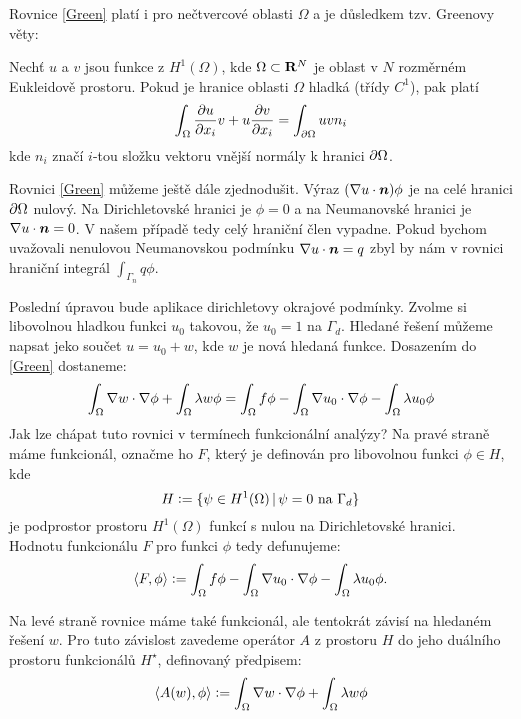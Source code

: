 Rovnice \eqref{Green} platí i pro nečtvercové oblasti $\Omega$ a je důsledkem tzv. Greenovy věty:
\begin{theorem}[Greenova]
   Nechť $u$ a $v$ jsou funkce z $H^1(\Omega)$, kde $\Omega\subset {\rm\bf R}^N$ je oblast v $N$ rozměrném Eukleidově prostoru. 
   Pokud je hranice oblasti $\Omega$ hladká (třídy $C^1$), pak platí
   \[
      \int_\Omega \frac{\partial u}{\partial x_i} v + u \frac{\partial v}{\partial x_i} = \int_{\partial\Omega} uv n_{i}
   \]
   kde $n_{i}$ značí $i$-tou složku vektoru vnější normály k hranici $\partial\Omega$.
\end{theorem}

Rovnici \eqref{Green} můžeme ještě dále zjednodušit. Výraz $(\nabla u \cdot \mathbf{\boldsymbol{n}})\phi$ je na celé hranici $\partial\Omega$ nulový. 
Na Dirichletovské hranici je $\phi = 0$ a na Neumanovské hranici je $\nabla u \cdot \mathbf{\boldsymbol{n}} = 0$. V našem případě tedy celý hraniční člen vypadne. 
Pokud bychom uvažovali nenulovou Neumanovskou podmínku $\nabla u \cdot \mathbf{\boldsymbol{n}} = q$ zbyl by nám v rovnici hraniční integrál $\int_{\Gamma_n} q\phi$.

Poslední úpravou bude aplikace dirichletovy okrajové podmínky. Zvolme si libovolnou hladkou funkci $u_0$ takovou, že $u_0= 1$ na $\Gamma_d$.
Hledané řešení můžeme napsat jeko součet $u = u_0 +w$, kde $w$ je nová hledaná funkce. Dosazením do \eqref{Green} dostaneme:
\begin{equation}
  \label{WeekForm}
 \int_\Omega \nabla w \cdot \nabla \phi + \int_\Omega \lambda w\phi
  =\int_\Omega f\phi - \int_\Omega \nabla u_0 \cdot \nabla \phi - \int_\Omega \lambda u_0\phi
\end{equation}
Jak lze chápat tuto rovnici v termínech funkcionální analýzy? Na pravé straně máme funkcionál, označme ho $F$, který je definován pro libovolnou
funkci $\phi \in H$, kde 
\begin{equation}
    \label{Hspace}
    H \mathrel{\mathop:}= \{ \psi \in H^1(\Omega) \,|\, \psi = 0\text{ na }\Gamma_d\}
\end{equation}
je podprostor prostoru $H^1(\Omega)$ funkcí s nulou na Dirichletovské hranici. Hodnotu funkcionálu $F$ pro funkci $\phi$ tedy defunujeme:
\[
 \langle F, \phi \rangle \mathrel{\mathop:}= \int_\Omega f\phi - \int_\Omega \nabla u_0 \cdot \nabla \phi - \int_\Omega \lambda u_0\phi.
\]

Na levé straně rovnice máme také funkcionál, ale tentokrát závisí na hledaném řešení $w$. Pro tuto závislost zavedeme operátor $A$ z prostoru $H$
do jeho duálního prostoru funkcionálů $H^\star$, definovaný předpisem:
\[
  \langle A(w), \phi \rangle \mathrel{\mathop:}= \int_\Omega \nabla w \cdot \nabla \phi + \int_\Omega \lambda w\phi
\]

